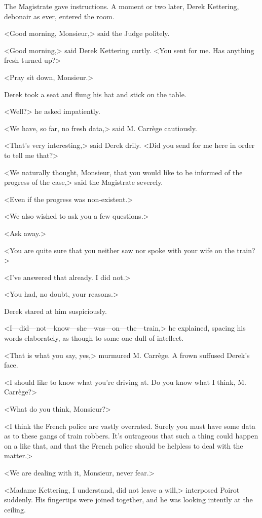The Magistrate gave instructions. A moment or two later, Derek Kettering, debonair as ever, entered the room.

<Good morning, Monsieur,> said the Judge politely.

<Good morning,> said Derek Kettering curtly. <You sent for me. Has anything fresh turned up?>

<Pray sit down, Monsieur.>

Derek took a seat and flung his hat and stick on the table.

<Well?> he asked impatiently.

<We have, so far, no fresh data,> said M. Carrège cautiously.

<That's very interesting,> said Derek drily. <Did you send for me here in order to tell me that?>

<We naturally thought, Monsieur, that you would like to be informed of the progress of the case,> said the Magistrate severely.

<Even if the progress was non-existent.>

<We also wished to ask you a few questions.>

<Ask away.>

<You are quite sure that you neither saw nor spoke with your wife on the train?>

<I've answered that already. I did not.>

<You had, no doubt, your reasons.>

Derek stared at him suspiciously.

<I—did—not—know—she—was—on—the—train,> he explained, spacing his words elaborately, as though to some one dull of intellect.

<That is what you say, yes,> murmured M. Carrège. A frown suffused Derek's face.

<I should like to know what you're driving at. Do you know what I think, M. Carrège?>

<What do you think, Monsieur?>

<I think the French police are vastly overrated. Surely you must have some data as to these gangs of train robbers. It's outrageous that such a thing could happen on a  like that, and that the French police should be helpless to deal with the matter.>

<We are dealing with it, Monsieur, never fear.>

<Madame Kettering, I understand, did not leave a will,> interposed Poirot suddenly. His fingertips were joined together, and he was looking intently at the ceiling.

